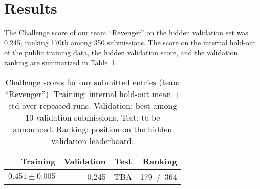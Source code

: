 \section{Results}
\label{sec:results}


The Challenge score of our team ``Revenger'' on the hidden validation set was 0.245, ranking 170th among 350 submissions. The score on the internal hold-out of the public training data, the hidden validation score, and the validation ranking are summarized in Table~\ref{tab:scores}.

\begin{table}[!htp]
\centering
\begin{tabular}{r|r|r|r}
Training & Validation & Test & Ranking \\\hline
$0.451 \pm 0.005$ & 0.245 & TBA & 179~/~364 \\\hline
\end{tabular}
\caption{Challenge scores for our submitted entries (team ``Revenger''). Training: internal hold-out mean $\pm$ std over repeated runs. Validation: best among 10 validation submissions. Test: to be announced. Ranking: position on the hidden validation leaderboard.}
\label{tab:scores}
\end{table}
